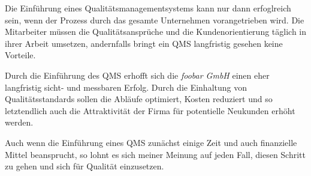 Die Einführung eines Qualitätsmanagementsystems kann nur dann erfoglreich sein, 
wenn der Prozess durch das gesamte Unternehmen vorangetrieben wird. Die 
Mitarbeiter müssen die Qualitätsansprüche und die Kundenorientierung täglich in 
ihrer Arbeit umsetzen, andernfalls bringt ein QMS langfristig gesehen keine
Vorteile. 

Durch die Einführung des QMS erhofft sich die \emph{foobar GmbH} einen eher
langfristig sicht- und messbaren Erfolg. Durch die Einhaltung von
Qualitätsstandards sollen die Abläufe optimiert, Kosten reduziert und so
letztendlich auch die Attraktivität der Firma für potentielle Neukunden erhöht
werden. 

Auch wenn die Einführung eines QMS zunächst einige Zeit und auch finanzielle
Mittel beansprucht, so lohnt es sich meiner Meinung auf jeden Fall, diesen
Schritt zu gehen und sich für Qualität einzusetzen.